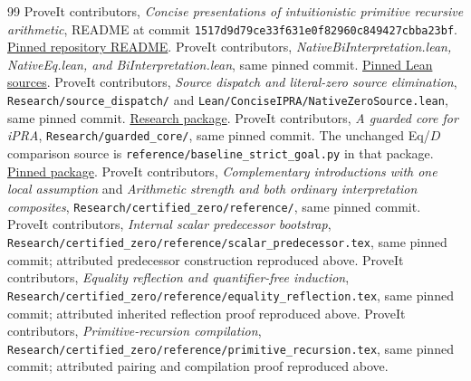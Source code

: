 \documentclass[11pt,letterpaper]{article}
\theoremstyle{definition}\newtheorem{definition}[theorem]{Definition}
\theoremstyle{remark}\newtheorem{remark}[theorem]{Remark}
\newcommand{\code}[1]{{\small\nolinkurl{#1}}}
\begin{document}
\begin{thebibliography}{99}
\footnotesize
{} ProveIt contributors,
\emph{Concise presentations of intuitionistic primitive recursive arithmetic},
README at commit \code{1517d9d79ce33f631e0f82960c849427cbba23bf}.
\href{https://github.com/VladimirReshetnikov/ProveIt/blob/1517d9d79ce33f631e0f82960c849427cbba23bf/Logic/PrimitiveRecursiveArithmetic/ConciseIPRA/README.md}{Pinned repository README}.
 ProveIt contributors,
\emph{NativeBiInterpretation.lean, NativeEq.lean, and BiInterpretation.lean},
same pinned commit.
\href{https://github.com/VladimirReshetnikov/ProveIt/tree/1517d9d79ce33f631e0f82960c849427cbba23bf/Logic/PrimitiveRecursiveArithmetic/ConciseIPRA/Lean/ConciseIPRA}{Pinned Lean sources}.
 ProveIt contributors,
\emph{Source dispatch and literal-zero source elimination},
\code{Research/source_dispatch/} and \code{Lean/ConciseIPRA/NativeZeroSource.lean},
same pinned commit.
\href{https://github.com/VladimirReshetnikov/ProveIt/tree/1517d9d79ce33f631e0f82960c849427cbba23bf/Logic/PrimitiveRecursiveArithmetic/ConciseIPRA/Research/source_dispatch}{Research package}.
 ProveIt contributors, \emph{A guarded core for iPRA},
\code{Research/guarded_core/}, same pinned commit. The unchanged Eq/$D$
comparison source is \code{reference/baseline_strict_goal.py} in that package.
\href{https://github.com/VladimirReshetnikov/ProveIt/tree/1517d9d79ce33f631e0f82960c849427cbba23bf/Logic/PrimitiveRecursiveArithmetic/ConciseIPRA/Research/guarded_core}{Pinned package}.
 ProveIt contributors,
\emph{Complementary introductions with one local assumption} and
\emph{Arithmetic strength and both ordinary interpretation composites},
\code{Research/certified_zero/reference/}, same pinned commit.
 ProveIt contributors,
\emph{Internal scalar predecessor bootstrap},
\code{Research/certified_zero/reference/scalar_predecessor.tex},
same pinned commit; attributed predecessor construction reproduced above.
 ProveIt contributors,
\emph{Equality reflection and quantifier-free induction},
\code{Research/certified_zero/reference/equality_reflection.tex},
same pinned commit; attributed inherited reflection proof reproduced above.
 ProveIt contributors,
\emph{Primitive-recursion compilation},
\code{Research/certified_zero/reference/primitive_recursion.tex},
same pinned commit; attributed pairing and compilation proof reproduced above.
\end{thebibliography}
\end{document}

